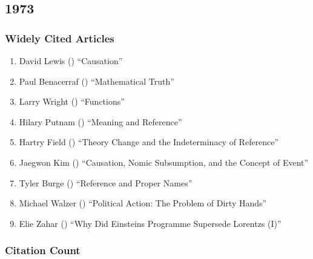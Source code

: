 \documentclass[
  10pt,
  letterpaper,
  DIV=11,
  numbers=noendperiod,
  twoside]{scrartcl}
\providecommand{\tightlist}{%
  \setlength{\itemsep}{0pt}\setlength{\parskip}{0pt}}\usepackage{longtable,booktabs,array}
\begin{document}
\newpage

\subsection{1973}\label{sec-s1973}

\subsubsection*{Widely Cited Articles}\label{widely-cited-articles-16}

\begin{enumerate}
\def\labelenumi{\arabic{enumi}.}
\tightlist
\item
  David Lewis () ``Causation''
\item
  Paul Benacerraf () ``Mathematical
  Truth''
\item
  Larry Wright () ``Functions''
\item
  Hilary Putnam () ``Meaning and
  Reference''
\item
  Hartry Field () ``Theory Change
  and the Indeterminacy of Reference''
\item
  Jaegwon Kim () ``Causation, Nomic
  Subsumption, and the Concept of Event''
\item
  Tyler Burge () ``Reference and
  Proper Names''
\item
  Michael Walzer () ``Political
  Action: The Problem of Dirty Hands''
\item
  Elie Zahar () ``Why Did
  Einsteins Programme Supersede Lorentzs (I)''
\end{enumerate}

\subsubsection*{Citation Count}\label{sec-count-1973}
\end{document}

